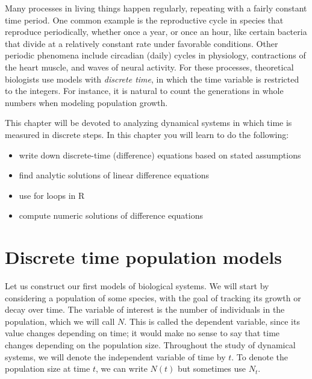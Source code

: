 \documentclass[
]{book}
\theoremstyle{definition}
\theoremstyle{definition}
\theoremstyle{definition}
\theoremstyle{remark}
\begin{document}
Many processes in living things happen regularly, repeating with a fairly constant time period. One common example is the reproductive cycle in species that reproduce periodically, whether once a year, or once an hour, like certain bacteria that divide at a relatively constant rate under favorable conditions. Other periodic phenomena include circadian (daily) cycles in physiology, contractions of the heart muscle, and waves of neural activity. For these processes, theoretical biologists use models with  \emph{discrete time}, in which the time variable is restricted to the integers. For instance, it is natural to count the generations in whole numbers when modeling population growth.

This chapter will be devoted to analyzing dynamical systems in which time is measured in discrete steps. In this chapter you will learn to do the following:

\begin{itemize}
\item
  write down discrete-time (difference) equations based on stated assumptions
\item
  find analytic solutions of linear difference equations
\item
  use for loops in R
\item
  compute numeric solutions of difference equations
\end{itemize}

\hypertarget{discrete-time-population-models}{%
\section{Discrete time population models}\label{discrete-time-population-models}}

\label{sec:model14}

Let us construct our first models of biological systems. We will start by considering a population of some species, with the goal of tracking its growth or decay over time. The variable of interest is the number of individuals in the population, which we will call \(N\). This is called the  dependent variable, since its value changes depending on time; it would make no sense to say that time changes depending on the population size. Throughout the study of dynamical systems, we will denote the  independent variable of time by \(t\). To denote the population size at time \(t\), we can write \(N(t)\) but sometimes use \(N_t\).
\end{document}
